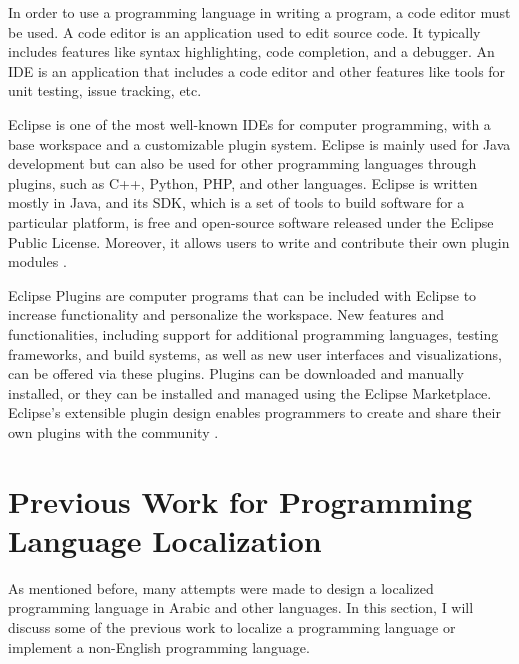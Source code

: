 In order to use a programming language in writing a program, a code editor must be used. A code editor is an application used to edit source code. It typically includes features like syntax highlighting, code completion, and a debugger. An \ac{IDE} is an application that includes a code editor and other features like tools for unit testing, issue tracking, etc.

Eclipse is one of the most well-known IDEs for computer programming, with a base workspace and a customizable plugin system. Eclipse is mainly used for Java development but can also be used for other programming languages through plugins, such as C++, Python, PHP, and other languages. Eclipse is written mostly in Java, and its \ac{SDK}, which is a set of tools to build software for a particular platform, is free and open-source software released under the Eclipse Public License. Moreover, it allows users to write and contribute their own plugin modules \cite{eclipseide}.

Eclipse Plugins are computer programs that can be included with Eclipse to increase functionality and personalize the workspace. New features and functionalities, including support for additional programming languages, testing frameworks, and build systems, as well as new user interfaces and visualizations, can be offered via these plugins. Plugins can be downloaded and manually installed, or they can be installed and managed using the Eclipse Marketplace. Eclipse's extensible plugin design enables programmers to create and share their own plugins with the community \cite{eclipseplugins}.
\section{Previous Work for Programming Language Localization}
As mentioned before, many attempts were made to design a localized programming language in Arabic and other languages. In this section, I will discuss some of the previous work to localize a programming language or implement a non-English programming language.
